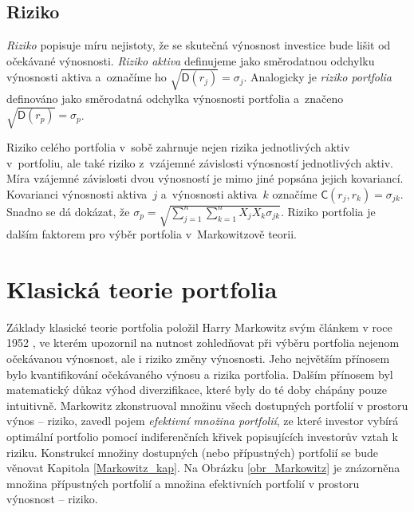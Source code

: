 \documentclass[a4paper,12pt]{report}
\theoremstyle{definition} \newtheorem{definice}[veta]{Definice}
\theoremstyle{remark}
\begin{document}
\subsection{Riziko}
\textit{Riziko} popisuje míru nejistoty, že se skutečná výnosnost investice bude lišit od očekávané výnosnosti.  
\textit{Riziko aktiva} definujeme jako směrodatnou odchylku výnosnosti aktiva a~označíme ho $\sqrt{\mathsf{D}(r_j)}=\sigma_j$.
Analogicky je \textit{riziko portfolia} definováno jako směrodatná odchylka výnosnosti portfolia a~značeno $\sqrt{\mathsf{D}(r_p)}=\sigma_p$.  

Riziko celého portfolia v~sobě zahrnuje nejen rizika jednotlivých aktiv v~portfoliu, ale také riziko z~vzájemné závislosti výnosností jednotlivých aktiv.
Míra vzájemné závislosti dvou výnosností je mimo jiné popsána jejich kovariancí. 
Kovarianci výnosnosti aktiva~$j$ a~výnosnosti aktiva~$k$ označíme $\mathsf{C}(r_j,r_k)=\sigma_{jk}$.
Snadno se dá dokázat, že $\sigma_p=\sqrt{\sum_{j=1}^n\sum_{k=1}^nX_jX_k\sigma_{jk}}$.
Riziko portfolia je dalším faktorem pro výběr portfolia v~Markowitzově teorii.  




\section{Klasická teorie portfolia}\label{KTP}

Základy klasické teorie portfolia položil Harry Markowitz svým článkem v roce 1952 \cite{markowitz}, ve kterém upozornil na nutnost zohledňovat při výběru portfolia nejenom očekávanou výnosnost, ale i riziko změny výnosnosti.
Jeho největším přínosem bylo kvantifikování očekávaného výnosu a rizika portfolia. 
Dalším přínosem byl matematický důkaz výhod diverzifikace, které byly do té doby chápány pouze intuitivně.
Markowitz zkonstruoval množinu všech dostupných portfolií v prostoru výnos -- riziko, zavedl pojem \textit{efektivní množina portfolií}, ze které investor vybírá optimální portfolio pomocí indiferenčních křivek popisujících investorův vztah k riziku.
Konstrukcí množiny dostupných (nebo přípustných) portfolií se bude věnovat Kapitola \ref{Markowitz_kap}. 
Na Obrázku \ref{obr_Markowitz} je znázorněna množina přípustných portfolií  a množina efektivních portfolií v prostoru výnosnost -- riziko. 
\end{document}
